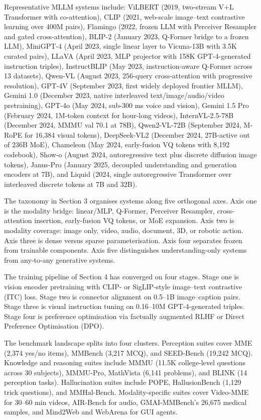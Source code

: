 \documentclass{article}
\begin{document}
Representative MLLM systems include: ViLBERT (2019, two-stream V+L Transformer with co-attention), CLIP (2021, web-scale image--text contrastive learning over 400M pairs), Flamingo (2022, frozen LLM with Perceiver Resampler and gated cross-attention), BLIP-2 (January 2023, Q-Former bridge to a frozen LLM), MiniGPT-4 (April 2023, single linear layer to Vicuna-13B with 3.5K curated pairs), LLaVA (April 2023, MLP projector with 158K GPT-4-generated instruction triples), InstructBLIP (May 2023, instruction-aware Q-Former across 13 datasets), Qwen-VL (August 2023, 256-query cross-attention with progressive resolution), GPT-4V (September 2023, first widely deployed frontier MLLM), Gemini 1.0 (December 2023, native interleaved text/image/audio/video pretraining), GPT-4o (May 2024, sub-300 ms voice and vision), Gemini 1.5 Pro (February 2024, 1M-token context for hour-long videos), InternVL-2.5-78B (December 2024, MMMU val 70.1 at 78B), Qwen2-VL-72B (September 2024, M-RoPE for 16,384 visual tokens), DeepSeek-VL2 (December 2024, 27B-active out of 236B MoE), Chameleon (May 2024, early-fusion VQ tokens with 8,192 codebook), Show-o (August 2024, autoregressive text plus discrete diffusion image tokens), Janus-Pro (January 2025, decoupled understanding and generation encoders at 7B), and Liquid (2024, single autoregressive Transformer over interleaved discrete tokens at 7B and 32B).

The taxonomy in Section 3 organises systems along five orthogonal axes. Axis one is the modality bridge: linear/MLP, Q-Former, Perceiver Resampler, cross-attention insertion, early-fusion VQ tokens, or MoE expansion. Axis two is modality coverage: image only, video, audio, document, 3D, or robotic action. Axis three is dense versus sparse parameterisation. Axis four separates frozen from trainable components. Axis five distinguishes understanding-only systems from any-to-any generative systems.

The training pipeline of Section 4 has converged on four stages. Stage one is vision encoder pretraining with CLIP- or SigLIP-style image--text contrastive (ITC) loss. Stage two is connector alignment on 0.5--1B image--caption pairs. Stage three is visual instruction tuning on 0.16--10M GPT-4-generated triples. Stage four is preference optimisation via factually augmented RLHF or Direct Preference Optimisation (DPO).

The benchmark landscape splits into four clusters. Perception suites cover MME (2,374 yes/no items), MMBench (3,217 MCQ), and SEED-Bench (19,242 MCQ). Knowledge and reasoning suites include MMMU (11.5K college-level questions across 30 subjects), MMMU-Pro, MathVista (6,141 problems), and BLINK (14 perception tasks). Hallucination suites include POPE, HallusionBench (1,129 trick questions), and MMHal-Bench. Modality-specific suites cover Video-MME for 30--60 min videos, AIR-Bench for audio, GMAI-MMBench's 26,675 medical samples, and Mind2Web and WebArena for GUI agents.
\end{document}
